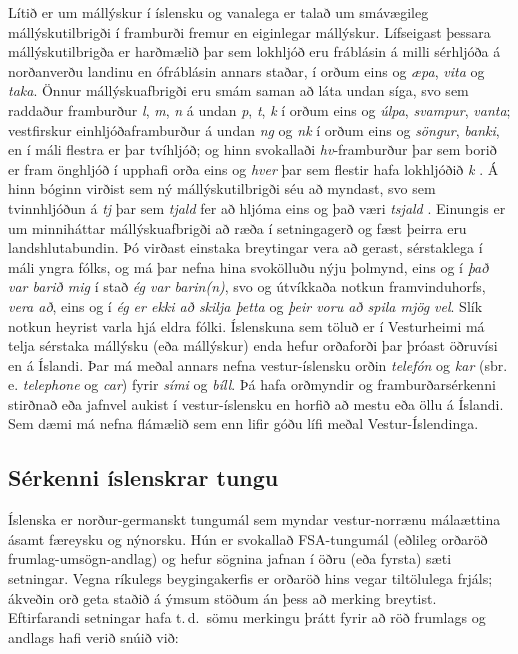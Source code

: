 \begin{multicols}{2}
Lítið er um mállýskur í íslensku og vanalega er talað um smávægileg mállýskutilbrigði í framburði fremur en eiginlegar mállýskur. Lífseigast þessara mállýskutilbrigða er harðmælið þar sem lokhljóð eru fráblásin á milli sérhljóða á norðanverðu landinu en ófráblásin annars staðar, í orðum eins og \textit{æpa}, \textit{vita} og \textit{taka}. Önnur mállýskuafbrigði eru smám saman að láta undan síga, svo sem raddaður framburður \textit{l}, \textit{m}, \textit{n} á undan \textit{p}, \textit{t}, \textit{k} í orðum eins og \textit{úlpa}, \textit{svampur}, \textit{vanta};  vestfirskur einhljóðaframburður á undan \textit{ng} og \textit{nk} í orðum eins og \textit{söngur}, \textit{banki}, en í máli flestra er þar tvíhljóð; og hinn svokallaði \textit{hv}-framburður þar sem borið er fram önghljóð í upphafi orða eins og \textit{hver} þar sem flestir hafa lokhljóðið \textit{k} \cite{mal1}.  Á hinn bóginn virðist sem ný mállýskutilbrigði séu að myndast, svo sem tvinnhljóðun á \textit{tj} þar sem \textit{tjald} fer að hljóma eins og það væri \textit{tsjald} \cite{tvi1}.
Einungis er um minniháttar mállýskuafbrigði að ræða í setningagerð og fæst þeirra eru landshlutabundin. Þó virðast einstaka breytingar vera að gerast, sérstaklega í máli yngra fólks, og má þar nefna hina svokölluðu nýju þolmynd, eins og í \textit{það var barið mig} í stað \textit{ég var barin(n)}, svo og útvíkkaða notkun framvinduhorfs, \textit{vera að}, eins og í \textit{ég er ekki að skilja þetta} og \textit{þeir voru að spila mjög vel}. Slík notkun heyrist varla hjá eldra fólki.
Íslenskuna sem töluð er í Vesturheimi má telja sérstaka mállýsku (eða mállýskur) enda hefur orðaforði þar þróast öðruvísi en á Íslandi. Þar má meðal annars nefna vestur-íslensku orðin \textit{telefón} og \textit{kar} (sbr. e. \textit{telephone} og \textit{car}) fyrir \textit{sími} og \textit{bíll}. Þá hafa orðmyndir og framburðarsérkenni stirðnað eða jafnvel aukist í vestur-íslensku en horfið að mestu eða öllu á Íslandi. Sem dæmi má nefna flámælið sem enn lifir góðu lífi meðal Vestur-Íslendinga.

\subsection{Sérkenni íslenskrar tungu}

Íslenska er norður-germanskt tungumál sem myndar vestur-norrænu málaættina ásamt færeysku og ný\-norsku. Hún er svokallað FSA-tungumál (eðlileg orða\-röð frumlag-umsögn-andlag) og hefur sögnina jafnan í öðru (eða fyrsta) sæti setningar. Vegna ríkulegs beygingakerfis er orðaröð hins vegar tiltölulega frjáls; ákveðin orð geta staðið á ýmsum stöðum án þess að merking breytist. Eftirfarandi setningar hafa t.\,d.~sömu merkingu þrátt fyrir að röð frumlags og andlags hafi verið snúið við:


\end{multicols}
